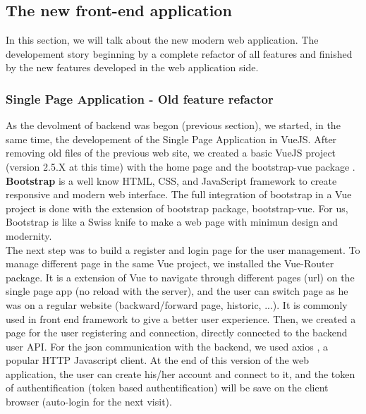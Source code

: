 \documentclass{eplmastersthesis}
\begin{document}
      \subsection{The new front-end application} %

        In this section, we will talk about the new modern web application. 
        The developement story beginning by a complete refactor of all features 
        and finished by the new features developed in the web application side.

        \subsubsection{Single Page Application - Old feature refactor}
        As the devolment of backend was begon (previous section), we started, in the same time, the
        developement of the Single Page Application in VueJS. After removing
        old files of the previous web site, we created a basic VueJS project
        (version 2.5.X at this time) with the home page and the bootstrap-vue
        package \cite{BootstrapVue}. \textbf{Bootstrap} \cite{Bootstrap} is a
        well know HTML, CSS, and JavaScript framework to create responsive and
        modern web interface. The full integration of bootstrap in a Vue
        project is done with the extension of bootstrap package, bootstrap-vue.
        For us, Bootstrap is like a Swiss knife to make a web page with minimun
        design and modernity. \\

        The next step was to build a register and login page for the user
        management. To manage different page in the same Vue project, we
        installed the Vue-Router package. It is a extension of Vue to navigate
        through different pages (url) on the single page app (no reload with
        the server), and the user can switch page as he was on a regular
        website (backward/forward page, historic, ...). It is commonly used in
        front end framework to give a better user experience. Then, we created
        a page for the user registering and connection, directly connected to
        the backend user API. For the json communication with the backend, we
        used axios \cite{axios}, a popular HTTP Javascript client. At the end
        of this version of the web application, the user can create his/her
        account and connect to it, and the token of authentification (token
        based authentification) will be save on the client browser (auto-login
        for the next visit). \\
\end{document}
